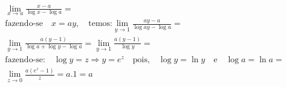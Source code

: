 \begin{ex}
\begin{align}
&\lim_{x\rightarrow a} \frac{x-a}{\log{x}-\log{a}}=\nonumber\\
&\text{fazendo-se}\quad x=ay,\quad\text{temos:}\lim_{y\rightarrow 1} \frac{ay-a}{\log{ay}-\log{a}}=\nonumber\\
&\lim_{y\rightarrow 1} \frac{a(y-1)}{\log{a}+\log{y}-\log{a}}=\lim_{y\rightarrow 1} \frac{a(y-1)}{\log{y}}=\nonumber\\
&\text{fazendo-se:}\quad\log{y}=z\Rightarrow y=e^z\quad\text{pois,}\quad\log{y}=\ln{y}\quad\text{e}\quad\log{a}=\ln{a}=\nonumber\\
&\lim_{z\rightarrow 0}\frac{a(e^z-1)}{z}=a.1=a\nonumber
\end{align}
\end{ex}